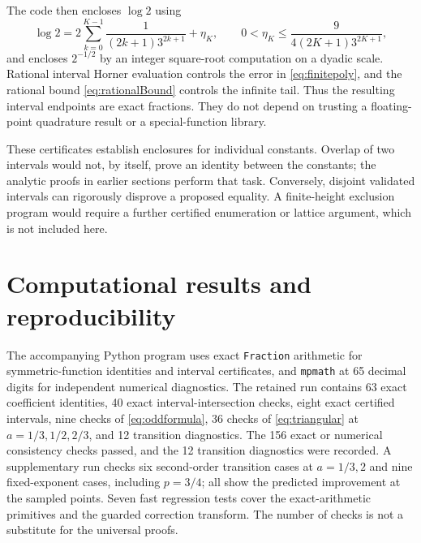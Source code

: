 \documentclass[11pt]{article}
\numberwithin{equation}{section}
\theoremstyle{definition}\newtheorem{definition}[theorem]{Definition}
\theoremstyle{remark}\newtheorem{remark}[theorem]{Remark}
\newcommand{\src}[1]{\nolinkurl{#1}}
\begin{document}
The code then encloses $\log2$ using
\[
 \log2=2\sum_{k=0}^{K-1}\frac1{(2k+1)3^{2k+1}}+\eta_K,
 \qquad0<\eta_K\le\frac9{4(2K+1)3^{2K+1}},
\]
and encloses $2^{-1/2}$ by an integer square-root computation on a dyadic scale. Rational interval Horner evaluation controls the error in \eqref{eq:finitepoly}, and the rational bound \eqref{eq:rationalBound} controls the infinite tail. Thus the resulting interval endpoints are exact fractions. They do not depend on trusting a floating-point quadrature result or a special-function library.

These certificates establish enclosures for individual constants. Overlap of two intervals would not, by itself, prove an identity between the constants; the analytic proofs in earlier sections perform that task. Conversely, disjoint validated intervals can rigorously disprove a proposed equality. A finite-height exclusion program would require a further certified enumeration or lattice argument, which is not included here.

\section{Computational results and reproducibility}
\label{sec:computations}

The accompanying Python program uses exact \src{Fraction} arithmetic for symmetric-function identities and interval certificates, and \src{mpmath} at 65 decimal digits for independent numerical diagnostics. The retained run contains 63 exact coefficient identities, 40 exact interval-intersection checks, eight exact certified intervals, nine checks of \eqref{eq:oddformula}, 36 checks of \eqref{eq:triangular} at $a=1/3,1/2,2/3$, and 12 transition diagnostics. The 156 exact or numerical consistency checks passed, and the 12 transition diagnostics were recorded. A supplementary run checks six second-order transition cases at $a=1/3,2$ and nine fixed-exponent cases, including $p=3/4$; all show the predicted improvement at the sampled points. Seven fast regression tests cover the exact-arithmetic primitives and the guarded correction transform. The number of checks is not a substitute for the universal proofs.
\end{document}
